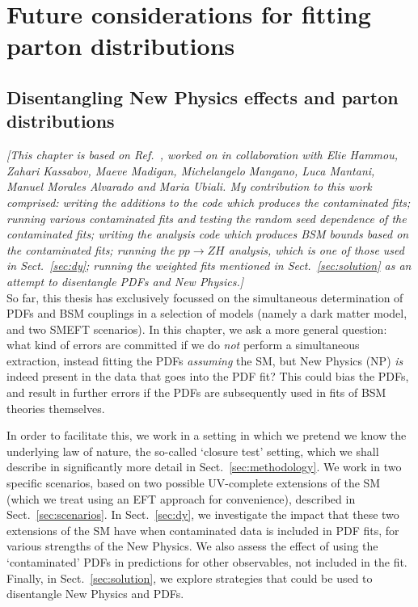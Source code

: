 \documentclass[withindex,glossary]{cam-thesis}
\begin{document}
\newpage
\part{Future considerations for fitting parton distributions}
\chapter{Disentangling New Physics effects and parton distributions}
\label{chap:contamination}

\textit{[This chapter is based on Ref.~\cite{Hammou:2023heg}, worked on in collaboration with Elie Hammou, Zahari Kassabov, Maeve Madigan, Michelangelo Mangano, Luca Mantani, Manuel Morales Alvarado and Maria Ubiali. My contribution to this work comprised: writing the additions to the code which produces the contaminated fits; running various contaminated fits and testing the random seed dependence of the contaminated fits; writing the analysis code which produces BSM bounds based on the contaminated fits; running the $pp \rightarrow ZH$ analysis, which is one of those used in Sect.~\ref{sec:dy}; running the weighted fits mentioned in Sect.~\ref{sec:solution} as an attempt to disentangle PDFs and New Physics.]}\\

\noindent So far, this thesis has exclusively focussed on the simultaneous determination of PDFs
and BSM couplings in a selection of models (namely a dark matter model, and two SMEFT scenarios). 
In this chapter, we ask a more general question: what kind of errors are committed if we do \textit{not} 
perform a simultaneous extraction, instead fitting the PDFs \textit{assuming} the SM,
but New Physics (NP) \textit{is} indeed present in the data that goes into the PDF fit? This could bias the
PDFs, and result in further errors if the PDFs are subsequently used in fits of BSM theories themselves. 

In order to facilitate this, we work in a setting in which we pretend
we know the underlying law of nature, the so-called `closure test' setting, which we shall describe in 
significantly more detail in Sect.~\ref{sec:methodology}. We work in two specific scenarios, based 
on two possible UV-complete extensions of the SM (which we treat using an EFT approach for 
convenience), described in Sect.~\ref{sec:scenarios}. In Sect.~\ref{sec:dy}, we investigate the impact
that these two extensions of the SM have when contaminated data is included in PDF fits, for various strengths of the New Physics.
We also assess the effect of using the `contaminated' PDFs
in predictions for other observables, not included in the fit.
Finally, in Sect.~\ref{sec:solution}, we explore strategies that could be used to disentangle New Physics
and PDFs. 
\end{document}
